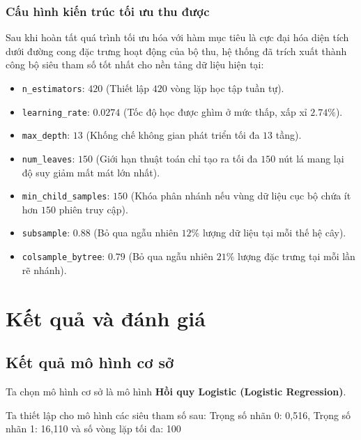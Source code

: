 \documentclass[a4paper,11pt]{article}
\begin{document}
\subsubsection*{Cấu hình kiến trúc tối ưu thu được}
Sau khi hoàn tất quá trình tối ưu hóa với hàm mục tiêu là cực đại hóa diện tích dưới đường cong đặc trưng hoạt động của bộ thu, hệ thống đã trích xuất thành công bộ siêu tham số tốt nhất cho nền tảng dữ liệu hiện tại:

\begin{itemize}[itemsep=4pt, leftmargin=*]
    \item \texttt{n\_estimators}: $420$ (Thiết lập $420$ vòng lặp học tập tuần tự).
    \item \texttt{learning\_rate}: $0.0274$ (Tốc độ học được ghìm ở mức thấp, xấp xỉ $2.74\%$).
    \item \texttt{max\_depth}: $13$ (Khống chế không gian phát triển tối đa $13$ tầng).
    \item \texttt{num\_leaves}: $150$ (Giới hạn thuật toán chỉ tạo ra tối đa $150$ nút lá mang lại độ suy giảm mất mát lớn nhất).
    \item \texttt{min\_child\_samples}: $150$ (Khóa phân nhánh nếu vùng dữ liệu cục bộ chứa ít hơn $150$ phiên truy cập).
    \item \texttt{subsample}: $0.88$ (Bỏ qua ngẫu nhiên $12\%$ lượng dữ liệu tại mỗi thế hệ cây).
    \item \texttt{colsample\_bytree}: $0.79$ (Bỏ qua ngẫu nhiên $21\%$ lượng đặc trưng tại mỗi lần rẽ nhánh).
\end{itemize}
\section{Kết quả và đánh giá}
\subsection{Kết quả mô hình cơ sở }
Ta chọn mô hình cơ sở là mô hình \textbf{Hồi quy Logistic (Logistic Regression)}. 

Ta thiết lập cho mô hình các siêu tham số sau: Trọng số nhãn 0: 0,516, Trọng số nhãn 1: 16,110 và số vòng lặp tối đa: 100 
\end{document}
